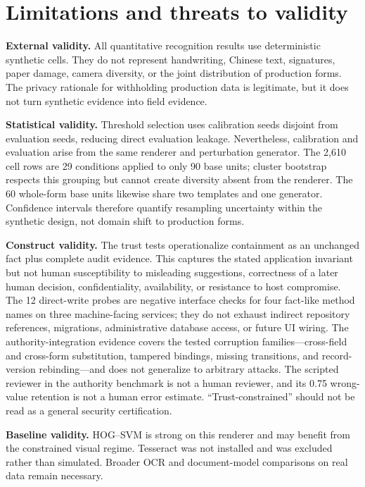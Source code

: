 \section{Limitations and threats to validity}
\label{sec:limitations}

\textbf{External validity.} All quantitative recognition results use deterministic synthetic cells. They do not represent handwriting, Chinese text, signatures, paper damage, camera diversity, or the joint distribution of production forms. The privacy rationale for withholding production data is legitimate, but it does not turn synthetic evidence into field evidence.

\textbf{Statistical validity.} Threshold selection uses calibration seeds disjoint from evaluation seeds, reducing direct evaluation leakage. Nevertheless, calibration and evaluation arise from the same renderer and perturbation generator. The 2,610 cell rows are 29 conditions applied to only 90 base units; cluster bootstrap respects this grouping but cannot create diversity absent from the renderer. The 60 whole-form base units likewise share two templates and one generator. Confidence intervals therefore quantify resampling uncertainty within the synthetic design, not domain shift to production forms.

\textbf{Construct validity.} The trust tests operationalize containment as an unchanged fact plus complete audit evidence. This captures the stated application invariant but not human susceptibility to misleading suggestions, correctness of a later human decision, confidentiality, availability, or resistance to host compromise. The 12 direct-write probes are negative interface checks for four fact-like method names on three machine-facing services; they do not exhaust indirect repository references, migrations, administrative database access, or future UI wiring. The authority-integration evidence covers the tested corruption families---cross-field and cross-form substitution, tampered bindings, missing transitions, and record-version rebinding---and does not generalize to arbitrary attacks. The scripted reviewer in the authority benchmark is not a human reviewer, and its 0.75 wrong-value retention is not a human error estimate. ``Trust-constrained'' should not be read as a general security certification.

\textbf{Baseline validity.} HOG--SVM is strong on this renderer and may benefit from the constrained visual regime. Tesseract was not installed and was excluded rather than simulated. Broader OCR and document-model comparisons on real data remain necessary.

